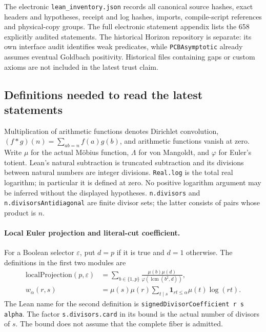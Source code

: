 \documentclass[11pt,a4paper]{article}
\theoremstyle{definition}
\theoremstyle{remark}
\newcommand{\muMob}{\mu}
\newcommand{\Lam}{\Lambda}
\newcommand{\ph}{\varphi}
\begin{document}
The electronic \texttt{lean\_inventory.json} records all canonical source
hashes, exact headers and hypotheses, receipt and log hashes, imports,
compile-script references and physical-copy groups. The full electronic
statement appendix lists the 658 explicitly audited statements. The
historical Horizon repository is separate: its own interface audit
identifies weak predicates, while \texttt{PCBAsymptotic} already assumes
eventual Goldbach positivity. Historical files containing gaps or custom
axioms are not included in the latest trust claim.

\subsection{Definitions needed to read the latest statements}

Multiplication of arithmetic functions denotes Dirichlet convolution,
\((f*g)(n)=\sum_{ab=n}f(a)g(b)\), and arithmetic functions vanish at zero.
Write \(\muMob\) for the actual M\"obius function,
\(\Lam\) for von Mangoldt, and \(\ph\) for Euler's totient.
Lean's natural subtraction is truncated subtraction and its divisions
between natural numbers are integer divisions. \texttt{Real.log} is the
total real logarithm; in particular it is defined at zero. No positive
logarithm argument may be inferred without the displayed hypotheses.
\texttt{n.divisors} and \texttt{n.divisorsAntidiagonal} are finite divisor
sets; the latter consists of pairs whose product is \(n\).

\paragraph{Local Euler projection and literal-cut coefficient.}
For a Boolean selector \(\varepsilon\), put \(d=p\) if it is true
and \(d=1\) otherwise. The definitions in the first two modules are
\begin{align*}
 \mathrm{localProjection}(p,\varepsilon)
 &=\sum_{b\in\{1,p\}}
   \frac{\muMob(b)\muMob(d)}{\ph(\operatorname{lcm}(b^2,d))},\\
 w_\alpha(r,s)
 &=\muMob(s)\muMob(r)
   \sum_{t\mid s}\mathbf1_{rt\le\alpha}\muMob(t)\log(rt).
\end{align*}
The Lean name for the second definition is
\texttt{signedDivisorCoefficient r s alpha}. The factor
\texttt{s.divisors.card} in its bound is the actual number of divisors
of \(s\). The bound does not assume that the complete fiber is admitted.
\end{document}
